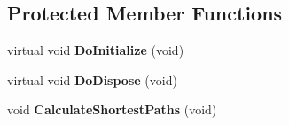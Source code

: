 \subsection*{\-Protected \-Member \-Functions}
\begin{DoxyCompactItemize}
\item 
\hypertarget{classns3_1_1PLC__Graph_ac8a6a73c5a49f4b55c72fc779ad89fda}{virtual void {\bfseries \-Do\-Initialize} (void)}\label{classns3_1_1PLC__Graph_ac8a6a73c5a49f4b55c72fc779ad89fda}

\item 
\hypertarget{classns3_1_1PLC__Graph_ab6d36d72337828e7691210a4f97d6aad}{virtual void {\bfseries \-Do\-Dispose} (void)}\label{classns3_1_1PLC__Graph_ab6d36d72337828e7691210a4f97d6aad}

\item 
\hypertarget{classns3_1_1PLC__Graph_aa521edba859d97fe0486768367dcef25}{void {\bfseries \-Calculate\-Shortest\-Paths} (void)}\label{classns3_1_1PLC__Graph_aa521edba859d97fe0486768367dcef25}

\end{DoxyCompactItemize}
